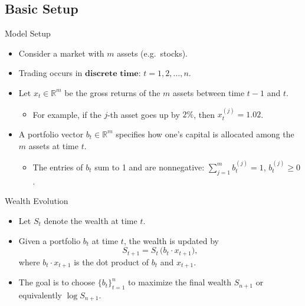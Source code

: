 \documentclass{beamer}
\begin{document}
\begin{small}
\section{Basic Setup}
\begin{frame}{Model Setup}
  \begin{itemize}
    \item Consider a market with \(m\) assets (e.g.\ stocks).
    \item Trading occurs in \(\textbf{discrete time}\): \(t = 1, 2, \ldots, n\).
    \item Let \(x_{t} \in \mathbb{R}^m\) be the gross returns of the \(m\) assets between time \(t-1\) and \(t\).
      \begin{itemize}
        \item For example, if the \(j\)-th asset goes up by \(2\%\), then \(x_{t}^{(j)} = 1.02\).
      \end{itemize}
    \item A portfolio vector \(b_t \in \mathbb{R}^m\) specifies how one’s capital is allocated among the \(m\) assets at time \(t\).
      \begin{itemize}
        \item The entries of \(b_t\) sum to 1 and are nonnegative: \(\sum_{j=1}^m b_t^{(j)} = 1\), \(b_t^{(j)} \ge 0\).
      \end{itemize}
  \end{itemize}
\end{frame}

\begin{frame}{Wealth Evolution}
  \begin{itemize}
    \item Let \(S_t\) denote the wealth at time \(t\).
    \item Given a portfolio \(b_t\) at time \(t\), the wealth is updated by
      \[
        S_{t+1} = S_t \, \bigl( b_t \cdot x_{t+1} \bigr),
      \]
      where \(b_t \cdot x_{t+1}\) is the dot product of \(b_t\) and \(x_{t+1}\).
    \item The goal is to choose \(\{b_t\}_{t=1}^n\) to maximize the final wealth \(S_{n+1}\) or equivalently 
          \(\log S_{n+1}\).
  \end{itemize}
\end{frame}


\end{small}
\end{document}
